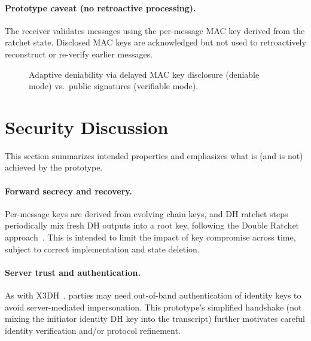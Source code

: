 \documentclass[11pt]{article}
\begin{document}
\paragraph{Prototype caveat (no retroactive processing).}
The receiver validates messages using the per-message MAC key derived from the ratchet state.
Disclosed MAC keys are acknowledged but not used to retroactively reconstruct or re-verify earlier messages.

\begin{figure}[t]
\centering
{}
\caption{Adaptive deniability via delayed MAC key disclosure (deniable mode) vs.~public signatures (verifiable mode).}
\label{fig:deniability}
\end{figure}

\section{Security Discussion}
This section summarizes intended properties and emphasizes what is (and is not) achieved by the prototype.

\paragraph{Forward secrecy and recovery.}
Per-message keys are derived from evolving chain keys, and DH ratchet steps periodically mix fresh DH outputs into a root key, following the Double Ratchet approach~\cite{signal_doubleratchet}.
This is intended to limit the impact of key compromise across time, subject to correct implementation and state deletion.

\paragraph{Server trust and authentication.}
As with X3DH~\cite{signal_x3dh}, parties may need out-of-band authentication of identity keys to avoid server-mediated impersonation.
This prototype's simplified handshake (not mixing the initiator identity DH key into the transcript) further motivates careful identity verification and/or protocol refinement.
\end{document}
